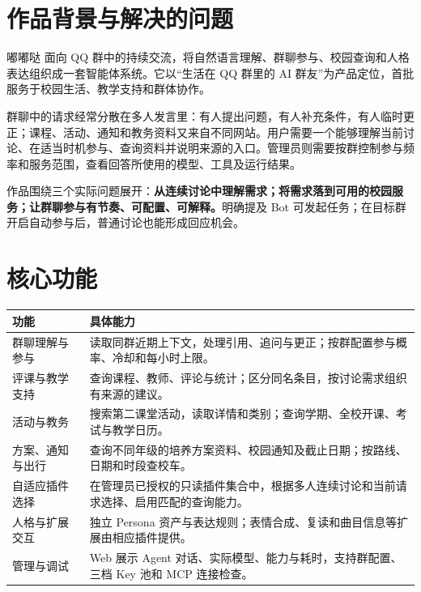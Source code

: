 \documentclass[lang=cn,chinesefont=nofont,11pt,a4paper,bibend=bibtex]{elegantpaper}
\begin{document}
\par
\vspace{5mm}
\par
\vspace{3mm}
\par
\vspace{2mm}
\par
\vspace{3mm}\noindent{\color{accent}\rule{\textwidth}{0.7pt}}\par

\section{作品背景与解决的问题}
嘟嘟哒 面向 QQ 群中的持续交流，将自然语言理解、群聊参与、校园查询和人格表达组织成一套智能体系统。它以“生活在 QQ 群里的 AI 群友”为产品定位，首批服务于校园生活、教学支持和群体协作。

群聊中的请求经常分散在多人发言里：有人提出问题，有人补充条件，有人临时更正；课程、活动、通知和教务资料又来自不同网站。用户需要一个能够理解当前讨论、在适当时机参与、查询资料并说明来源的入口。管理员则需要按群控制参与频率和服务范围，查看回答所使用的模型、工具及运行结果。

作品围绕三个实际问题展开：\textbf{从连续讨论中理解需求；将需求落到可用的校园服务；让群聊参与有节奏、可配置、可解释。}明确提及 Bot 可发起任务；在目标群开启自动参与后，普通讨论也能形成回应机会。

\section{核心功能}
\begin{tabularx}{\textwidth}{@{}L{32mm}Y@{}}\toprule
功能 & 具体能力\\\midrule
群聊理解与参与 & 读取同群近期上下文，处理引用、追问与更正；按群配置参与概率、冷却和每小时上限。\\
评课与教学支持 & 查询课程、教师、评论与统计；区分同名条目，按讨论需求组织有来源的建议。\\
活动与教务 & 搜索第二课堂活动，读取详情和类别；查询学期、全校开课、考试与教学日历。\\
方案、通知与出行 & 查询不同年级的培养方案资料、校园通知及截止日期；按路线、日期和时段查校车。\\
自适应插件选择 & 在管理员已授权的只读插件集合中，根据多人连续讨论和当前请求选择、启用匹配的查询能力。\\
人格与扩展交互 & 独立 Persona 资产与表达规则；表情合成、复读和曲目信息等扩展由相应插件提供。\\
管理与调试 & Web 展示 Agent 对话、实际模型、能力与耗时，支持群配置、三档 Key 池和 MCP 连接检查。\\\bottomrule
\end{tabularx}
\end{document}
